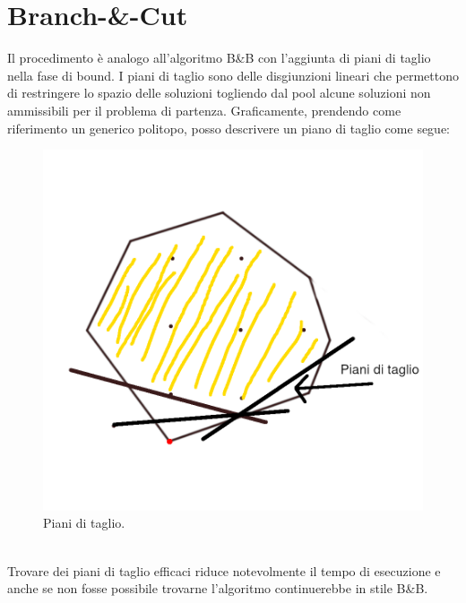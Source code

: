 \documentclass[12pt,a4paper,twoside,openright]{book}
\begin{document}
\section{Branch-\&-Cut}
Il procedimento è analogo all'algoritmo B\&B con l’aggiunta di piani di taglio nella fase di bound. I
piani di taglio sono delle disgiunzioni lineari che permettono di restringere lo spazio delle soluzioni
togliendo dal pool alcune soluzioni non ammissibili per il problema di partenza. Graficamente,
 prendendo come riferimento un generico politopo, posso descrivere un piano di taglio come segue:\\
\begin{figure}[ht]
    \centering
    \includegraphics [scale = 0.7]{cutting_planes.png}
    \caption{Piani di taglio. }
    \label{fig:cuts}
\end{figure}\\
Trovare dei piani di taglio efficaci riduce notevolmente il tempo di esecuzione e anche se non fosse 
possibile trovarne l'algoritmo continuerebbe in stile B\&B.
\end{document}
